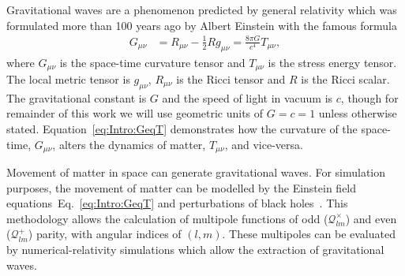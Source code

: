 \documentclass[../Thesis.tex]{subfiles}
\begin{document}
    Gravitational waves are a phenomenon predicted by general relativity which was formulated more than 100 years ago by Albert Einstein with the famous formula
    \begin{align}
        G_{\mu\nu} & = R_{\mu\nu} - \frac{1}{2}R  g_{\mu\nu}  =  \frac{8\pi G}{c^4} T_{\mu\nu}, \label{eq:Intro:GeqT}
    \end{align}
    where $G_{\mu\nu}$ is the space-time curvature tensor and $T_{\mu\nu}$ is the stress energy tensor. The local metric tensor is $g_{\mu\nu}$, $R_{\mu\nu}$ is the Ricci tensor and $R$ is the Ricci scalar. 
    The gravitational constant is $G$ and the speed of light in vacuum is $c$, though for remainder of this work we will use geometric units of $G=c=1$ unless otherwise stated. 
    Equation~\ref{eq:Intro:GeqT} demonstrates how the curvature of the space-time, $G_{\mu\nu}$, alters the dynamics of matter, $T_{\mu\nu}$, and vice-versa. \par
    Movement of matter in space can generate gravitational waves.
    For simulation purposes, the movement of matter can be modelled by the Einstein field equations~Eq.~\ref{eq:Intro:GeqT} and perturbations of black holes~\cite[e.g.,][]{Moncrief1974,Abrahams1996,Andrade1999,Nagar2005}.
    This methodology allows the calculation of multipole functions of odd ($\mathcal{Q}^\times_{lm}$) and even ($\mathcal{Q}^+_{lm}$) parity, with angular indices of $(l,m)$.
    These multipoles can be evaluated by numerical-relativity simulations which allow the extraction of gravitational waves.
\end{document}
